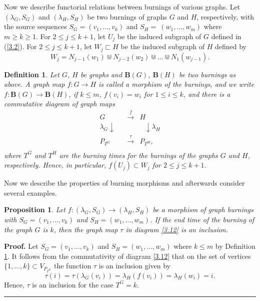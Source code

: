 \documentclass[a4paper, 11pt]{article}
\newtheorem{proposition}[theorem]{Proposition}
\newtheorem{definition}[theorem]{Definition}
\newenvironment{proof}[1][Proof]{\textbf{#1.} }{\ \rule{0.5em}{0.5em}}
\begin{document}
\bigskip

Now we describe functorial relations between burnings of various graphs. Let $(\lambda_G, S_G)$ and  $(\lambda_H, S_H)$  be two  burnings  of  graphs $G$  and $H$, respectively,  with the source sequences  $S_G=(v_1, \dots, v_k)$  and $S_H=~(w_1, \dots, w_m)$  where $m\geq k\geq 1$. 
 For $2\leq j\leq  k+1$, let $U_j$   be the induced subgraph of $G$ defined in (\ref{3.2}).  For $2\leq j\leq  k+1$,  let 
$W_j\sqsubset H $  be the induced subgraph of $H$ defined  by
\begin{equation}\label{3.11}
W_j=N_{j-1} (w_1)\Cup N_{j-2}(w_2)\Cup \dots \Cup N_1(w_{j-1}).
\end{equation}

\begin{definition}\label{d3.15} \rm  Let  $G$, $H$ be graphs and
$\mathbf B(G)$,  $\mathbf B(H)$ be two  burnings  as above.
  A graph map $f\colon G\to H$ is called a \emph{morphism of the burnings}, and we write $f\colon \mathbf B(G)\to \mathbf B(H)$,   if  $k\leq m$,    $f(v_i)=w_i$ for  $1\leq i\leq k$,  and  there is a  commutative diagram 
of graph maps
\begin{equation}\label{3.12}
\begin{matrix}
G &\overset{f}\longrightarrow & H\\
\lambda_G\downarrow\ \ \  \ &&\ \ \ \downarrow\lambda_H\\
P_{T^G} &\overset {\tau}\longrightarrow & P_{T^H}, \\
\end{matrix}
\end{equation}
where $T^G$ and $T^H$ are the burning times for the burnings  of  the graphs $G$ and $H$,  respectively. Hence, in particular,  $f(U_j)\subset W_j$ for $2\leq j\leq k+1$.
\end{definition}


Now we  describe the properties of burning morphisms and afterwards consider   several examples.

\begin{proposition}\label{p3.16} Let $f\colon (\lambda_G, S_G)\to (\lambda_H, S_H)$  be a morphism of graph burnings with $S_G=(v_1,\dots, v_k)$ and $S_H=(w_1, \dots , w_m)$.  If the end time of the burning of the graph $G$ is $k$, then the graph map $\tau$ in diagram \eqref{3.12} is an inclusion. 
\end{proposition}
\begin{proof} Let $S_G=(v_1,\dots, v_k)$ and $S_H=(w_1, \dots , w_m)$ where $k\leq m$ by Definition \ref{d3.15}. It follows from the commutativity of diagram \eqref{3.12} that on the set of vertices  $\{1,\dots, k\}\subset V_{P_{T^G}}$ the function $\tau$ is an inclusion given by 
\begin{equation}\label{3.13}
\tau(i) =\tau(\lambda_G(v_i))=\lambda_H(f(v_i))= \lambda_H(w_i)=i.
\end{equation}
Hence, $\tau$ is an inclusion for the case $T^G=k$.   
\end{proof} 
\end{document}
